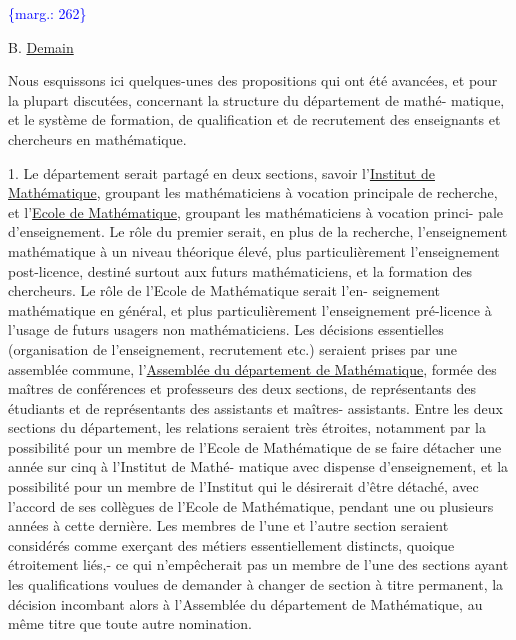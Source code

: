 \documentclass[11pt]{article}
\newcommand{\scanpage}[1]{\par\bigskip\noindent{\small\sffamily[scan #1]}\par}
\newcommand{\mspage}[1]{{\small\sffamily[p.\,#1]}}
\newcommand{\margin}[1]{\textcolor{blue}{\{\textsf{marg.:} #1\}}}
\newcommand{\uline}[1]{\underline{#1}}
\begin{document}
\margin{262}

\clearpage
\scanpage{119/263}
\mspage{10}

B. \uline{Demain}

Nous esquissons ici quelques-unes des propositions qui ont été avancées, et
pour la plupart discutées, concernant la structure du département de mathé-%
matique, et le système de formation, de qualification et de recrutement des
enseignants et chercheurs en mathématique.

1. Le département serait partagé en deux sections, savoir l'\uline{Institut de
Mathématique}, groupant les mathématiciens à vocation principale de recherche,
et l'\uline{Ecole de Mathématique}, groupant les mathématiciens à vocation princi-%
pale d'enseignement. Le rôle du premier serait, en plus de la recherche,
l'enseignement mathématique à un niveau théorique élevé, plus particulièrement
l'enseignement post-licence, destiné surtout aux futurs mathématiciens, et
la formation des chercheurs. Le rôle de l'Ecole de Mathématique serait l'en-%
seignement mathématique en général, et plus particulièrement l'enseignement
pré-licence à l'usage de futurs usagers non mathématiciens. Les décisions
essentielles (organisation de l'enseignement, recrutement etc.) seraient
prises par une assemblée commune, l'\uline{Assemblée du département de Mathématique},
formée des maîtres de conférences et professeurs des deux sections, de
représentants des étudiants et de représentants des assistants et maîtres-%
assistants. Entre les deux sections du département, les relations seraient
très étroites, notamment par la possibilité pour un membre de l'Ecole de
Mathématique de se faire détacher une année sur cinq à l'Institut de Mathé-%
matique avec dispense d'enseignement, et la possibilité pour un membre de
l'Institut qui le désirerait d'être détaché, avec l'accord de ses collègues
de l'Ecole de Mathématique, pendant une ou plusieurs années à cette dernière.
Les membres de l'une et l'autre section seraient considérés comme exerçant
des métiers essentiellement distincts, quoique étroitement liés,- ce qui
n'empêcherait pas un membre de l'une des sections ayant les qualifications
voulues de demander à changer de section à titre permanent, la décision
incombant alors à l'Assemblée du département de Mathématique, au même titre
que toute autre nomination.
\end{document}
